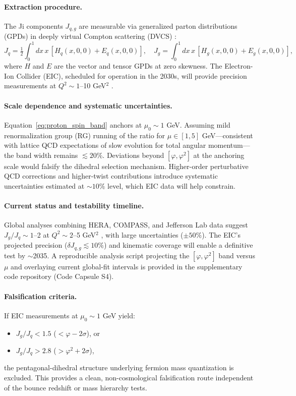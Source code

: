 \documentclass[12pt]{article}
\theoremstyle{definition}
\theoremstyle{plain}
\begin{document}
\paragraph{Extraction procedure.} The Ji components $J_{q,g}$ are measurable via generalized parton distributions (GPDs) in deeply virtual Compton scattering (DVCS) \cite{eic2022science}:
\begin{equation}
J_q=\tfrac{1}{2}\int_0^1\!dx\, x\,[H_q(x,0,0)+E_q(x,0,0)],\quad
J_g=\int_0^1\!dx\, x\,[H_g(x,0,0)+E_g(x,0,0)],
\end{equation}
where $H$ and $E$ are the vector and tensor GPDs at zero skewness. The Electron-Ion Collider (EIC), scheduled for operation in the 2030s, will provide precision measurements at $Q^2 \sim 1$--10 GeV$^2$ \cite{ethier2023eic}.

\paragraph{Scale dependence and systematic uncertainties.} Equation~\eqref{eq:proton_spin_band} anchors at $\mu_0 \sim 1$ GeV. Assuming mild renormalization group (RG) running of the ratio for $\mu \in [1, 5]$ GeV—consistent with lattice QCD expectations of slow evolution for total angular momentum—the band width remains $\lesssim 20\%$. Deviations beyond $[\varphi, \varphi^2]$ at the anchoring scale would falsify the dihedral selection mechanism. Higher-order perturbative QCD corrections and higher-twist contributions introduce systematic uncertainties estimated at $\sim 10\%$ level, which EIC data will help constrain.

\paragraph{Current status and testability timeline.} Global analyses combining HERA, COMPASS, and Jefferson Lab data suggest $J_g/J_q \sim 1$--2 at $Q^2 \sim 2$--5 GeV$^2$ \cite{star2021gluon}, with large uncertainties ($\pm 50\%$). The EIC's projected precision ($\delta J_{q,g} \lesssim 10\%$) and kinematic coverage will enable a definitive test by $\sim$2035. A reproducible analysis script projecting the $[\varphi, \varphi^2]$ band versus $\mu$ and overlaying current global-fit intervals is provided in the supplementary code repository (Code Capsule S4).

\paragraph{Falsification criteria.} If EIC measurements at $\mu_0 \sim 1$ GeV yield:
\begin{itemize}
\item $J_g/J_q < 1.5$ ($< \varphi - 2\sigma$), or
\item $J_g/J_q > 2.8$ ($> \varphi^2 + 2\sigma$),
\end{itemize}
the pentagonal-dihedral structure underlying fermion mass quantization is excluded. This provides a clean, non-cosmological falsification route independent of the bounce redshift or mass hierarchy tests.
\end{document}
